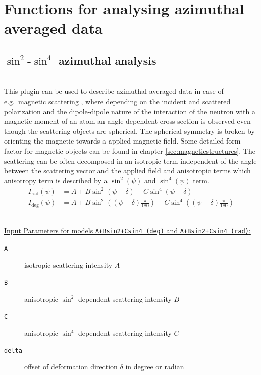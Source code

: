 \clearpage
\section{Functions for analysing azimuthal averaged data}



\subsection{$\sin^2$-$\sin^4$ azimuthal analysis} ~\\
This plugin can be used to describe azimuthal averaged data in case of e.g.\ magnetic scattering \cite{Wiedenmann2011}, where depending on the incident and scattered polarization and the dipole-dipole nature of the interaction of the neutron with a magnetic moment of an atom an angle dependent cross-section is observed even though the scattering objects are spherical. The spherical symmetry is broken by orienting the magnetic towards a applied magnetic field. Some detailed form factor for magnetic objects can be found in chapter \ref{sec:magneticstructures}. The scattering can be often decomposed in an isotropic term independent of the angle between the scattering vector and the applied field and anisotropic terms which anisotropy term is described by a $\sin^2(\psi)$ and $\sin^4(\psi)$ term.
\begin{align}
I_\mathrm{rad}(\psi) &= A + B\sin^2(\psi-\delta) + C \sin^4(\psi-\delta) \\
I_\mathrm{deg}(\psi) &= A + B\sin^2\left((\psi-\delta)\frac{\pi}{180}\right) + C \sin^4\left((\psi-\delta)\frac{\pi}{180}\right)
\end{align}

\hspace{1pt}\\
\uline{Input Parameters for models \texttt{A+Bsin2+Csin4 (deg)} and \texttt{A+Bsin2+Csin4 (rad)}:}\\
\begin{description}
\item[\texttt{A}] isotropic scattering intensity $A$
\item[\texttt{B}] anisotropic $\sin^2$-dependent scattering intensity $B$
\item[\texttt{C}] anisotropic $\sin^4$-dependent scattering intensity $C$
\item[\texttt{delta}] offset of deformation direction $\delta$ in degree or radian
\end{description}

